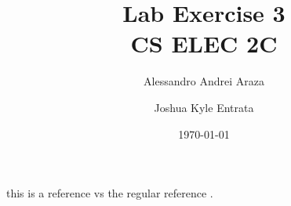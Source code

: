 

\title{{\Huge Lab Exercise 3}\\{\small CS ELEC 2C}}
\author{Alessandro Andrei Araza \and Joshua Kyle Entrata}
\date{\today}



    \maketitle

    \begin{abstract}
    \end{abstract}

    \begin{multicols}{2}
        \raggedcolumns
        
        
        
        
        
    \end{multicols}

    \cite{mitlohner_characteristics_2016}

    this is a reference \citep{gaines_emotional_1983} vs the regular reference \cite{gaines_emotional_1983}.
    \nocite{*}

    \newpage
    


